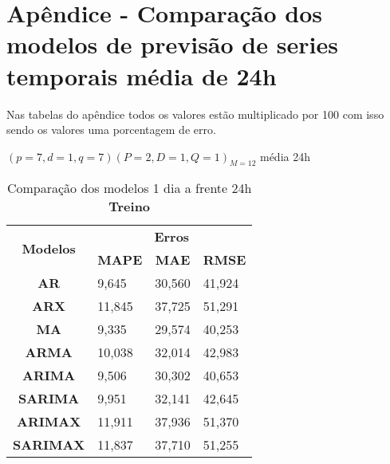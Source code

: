 
\section{Ap\^endice - Compara\c c\~ao dos modelos de previs\~ao de series temporais m\'edia de 24h}\label{sec:comtb24}

Nas tabelas do apêndice todos os valores estão multiplicado por 100 com isso sendo os valores uma porcentagem de erro.

$(p = 7,d = 1,q = 7) (P = 2,D = 1,Q = 1)_{M = 12}$ média 24h
	\begin{table}[H]
	\centering
	\caption{Comparação dos modelos 1 dia a frente 24h \textbf{Treino} }\label{tb:1-24trn}
	\begin{tabular}{@{}clll@{}}
		\toprule
		\multirow{2}{*}{\textbf{Modelos}} & \multicolumn{3}{c}{\textbf{Erros}}                                                                       \\ \cmidrule(l){2-4} 
		& \multicolumn{1}{c}{\textbf{MAPE}} & \multicolumn{1}{c}{\textbf{MAE}} & \multicolumn{1}{c}{\textbf{RMSE}} \\ \hline
\textbf{AR}                       & 9,645                             & 30,560                           & 41,924                            \\
\textbf{ARX}                      & 11,845                            & 37,725                           & 51,291                            \\
\textbf{MA}                       & 9,335                             & 29,574                           & 40,253                            \\
\textbf{ARMA}                     & 10,038                            & 32,014                           & 42,983                            \\
\textbf{ARIMA}                    & 9,506                             & 30,302                           & 40,653                            \\
\textbf{SARIMA}                   & 9,951                             & 32,141                           & 42,645                            \\
\textbf{ARIMAX}                   & 11,911                            & 37,936                           & 51,370                            \\
\textbf{SARIMAX}                  & 11,837                            & 37,710                           & 51,255                            \\

\end{tabular}
\end{table}
